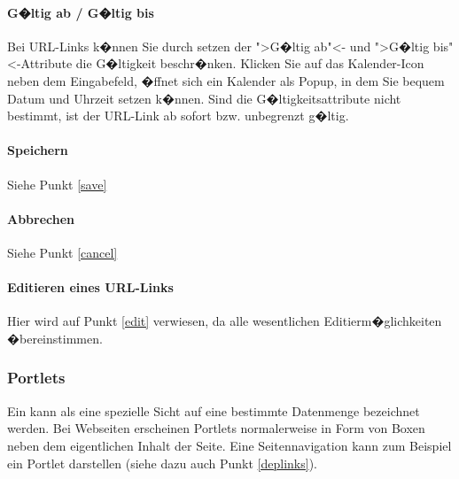 
\paragraph{G�ltig ab / G�ltig bis}
Bei URL-Links k�nnen Sie durch setzen der ">G�ltig ab"<- und ">G�ltig bis"<-Attribute die G�ltigkeit beschr�nken. Klicken Sie auf das Kalender-Icon neben dem Eingabefeld, �ffnet sich ein Kalender als Popup, in dem Sie bequem Datum und Uhrzeit setzen k�nnen. Sind die G�ltigkeitsattribute nicht bestimmt, ist der URL-Link ab sofort bzw. unbegrenzt g�ltig. 

\paragraph{Speichern}
Siehe Punkt \ref{save}

\paragraph{Abbrechen}
Siehe Punkt \ref{cancel}

\paragraph{Editieren eines URL-Links}
Hier wird auf Punkt \ref{edit} verwiesen, da alle wesentlichen Editierm�glichkeiten
�bereinstimmen.

\subsubsection{Portlets}
\label{portlets}

Ein  kann als eine spezielle Sicht auf eine bestimmte Datenmenge bezeichnet
werden. Bei Webseiten erscheinen Portlets normalerweise in Form von Boxen neben
dem eigentlichen Inhalt der Seite. Eine Seitennavigation kann zum Beispiel ein Portlet darstellen (siehe dazu auch Punkt \ref{deplinks}).

